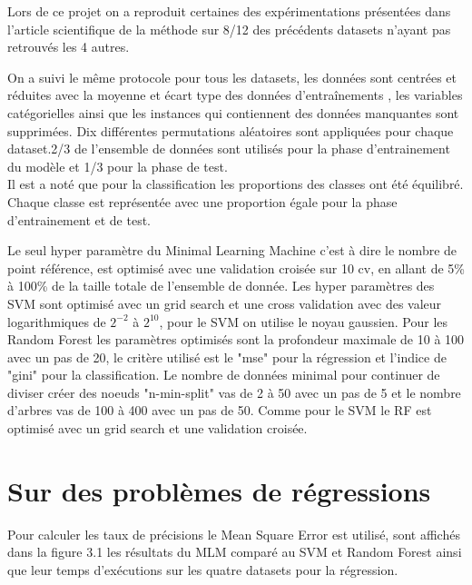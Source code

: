 \documentclass[12pt,a4paper]{report}
\begin{document}
\par Lors de ce projet on a reproduit certaines des expérimentations présentées dans l'article scientifique de la méthode sur 8/12 des précédents datasets n'ayant pas retrouvés les 4 autres.
\par On a suivi le même protocole pour tous les datasets, les données sont centrées et réduites avec la moyenne et écart type des données d’entraînements , les variables catégorielles ainsi que les instances qui contiennent des données manquantes sont supprimées. Dix différentes permutations aléatoires sont appliquées pour chaque dataset.2/3 de l'ensemble de données sont utilisés pour la phase d'entrainement du modèle et 1/3 pour la phase de test.\\
Il est a noté que pour la classification les proportions des classes ont été équilibré. Chaque classe est représentée avec une proportion égale pour la phase d'entrainement et de test.

\par Le seul hyper paramètre du Minimal Learning Machine c'est à dire le nombre de point référence, est optimisé avec une validation croisée sur 10 cv, en allant de 5\% à 100\% de la taille totale de l'ensemble de donnée.
Les hyper paramètres des SVM sont optimisé avec un grid search et une cross validation avec des valeur logarithmiques de $2^{-2}$ à $2^{10}$, pour le SVM on utilise le noyau gaussien. Pour les Random Forest les paramètres optimisés sont la profondeur maximale de 10 à 100 avec un pas de 20, le critère utilisé est le "mse" pour la régression et l'indice de "gini" pour la classification. Le nombre de données minimal pour continuer de diviser créer des noeuds "n-min-split" vas de 2 à 50 avec un pas de 5 et le nombre d'arbres vas de 100 à 400 avec un pas de 50. Comme pour le SVM le RF est optimisé avec un grid search et une validation croisée.\\

{\color{MidnightBlue}\section{Sur des problèmes de régressions}}
\par Pour calculer les taux de précisions le Mean Square Error est utilisé, sont affichés dans la figure 3.1 les résultats du MLM comparé au SVM et Random Forest ainsi que leur temps d'exécutions sur les quatre datasets pour la régression.
\end{document}
